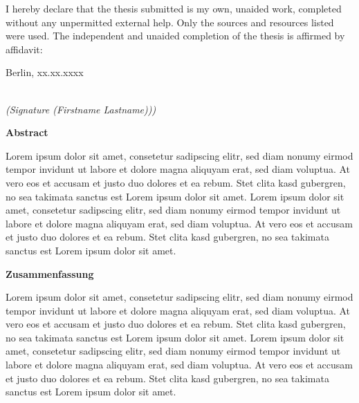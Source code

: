 \documentclass[11pt,oneside,a4paper]{book}
\begin{document}
\newpage\null\thispagestyle{empty}\newpage

\vspace*{6cm}

\noindent
I hereby declare that the thesis submitted is my own, unaided work, completed without any
unpermitted external help. Only the sources and resources listed were used.
The independent and unaided completion of the thesis is affirmed by affidavit:
\vspace{2cm}

\noindent
Berlin, xx.xx.xxxx

\vspace{3cm}

\hspace*{7cm}%
\dotfill\\
\hspace*{8.5cm}%
\textit{(Signature (Firstname Lastname)))}
\thispagestyle{empty}

\begin{LARGE} \centering \textbf{Abstract}\\[4ex]
\end{LARGE}

Lorem ipsum dolor sit amet, consetetur sadipscing elitr, sed diam nonumy eirmod tempor invidunt ut labore et dolore magna aliquyam erat, sed diam voluptua. At vero eos et accusam et justo duo dolores et ea rebum. Stet clita kasd gubergren, no sea takimata sanctus est Lorem ipsum dolor sit amet. Lorem ipsum dolor sit amet, consetetur sadipscing elitr, sed diam nonumy eirmod tempor invidunt ut labore et dolore magna aliquyam erat, sed diam voluptua. At vero eos et accusam et justo duo dolores et ea rebum. Stet clita kasd gubergren, no sea takimata sanctus est Lorem ipsum dolor sit amet.


\begin{LARGE} \centering \textbf{Zusammenfassung}\\[4ex]
\end{LARGE}

Lorem ipsum dolor sit amet, consetetur sadipscing elitr, sed diam nonumy eirmod tempor invidunt ut labore et dolore magna aliquyam erat, sed diam voluptua. At vero eos et accusam et justo duo dolores et ea rebum. Stet clita kasd gubergren, no sea takimata sanctus est Lorem ipsum dolor sit amet. Lorem ipsum dolor sit amet, consetetur sadipscing elitr, sed diam nonumy eirmod tempor invidunt ut labore et dolore magna aliquyam erat, sed diam voluptua. At vero eos et accusam et justo duo dolores et ea rebum. Stet clita kasd gubergren, no sea takimata sanctus est Lorem ipsum dolor sit amet.
\thispagestyle{empty}
\end{document}
